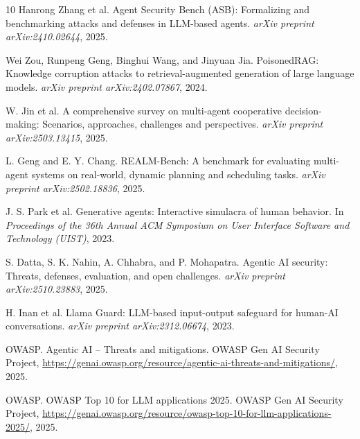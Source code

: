 \documentclass[11pt]{article}
\begin{document}
\begin{thebibliography}{10}
        Hanrong Zhang et al.
        \newblock Agent Security Bench (ASB): Formalizing and benchmarking attacks and defenses in LLM-based agents.
        \newblock \emph{arXiv preprint arXiv:2410.02644}, 2025.

        Wei Zou, Runpeng Geng, Binghui Wang, and Jinyuan Jia.
        \newblock PoisonedRAG: Knowledge corruption attacks to retrieval-augmented generation of large language models.
        \newblock \emph{arXiv preprint arXiv:2402.07867}, 2024.

        W. Jin et al.
        \newblock A comprehensive survey on multi-agent cooperative decision-making: Scenarios, approaches, challenges and perspectives.
        \newblock \emph{arXiv preprint arXiv:2503.13415}, 2025.

        L. Geng and E. Y. Chang.
        \newblock REALM-Bench: A benchmark for evaluating multi-agent systems on real-world, dynamic planning and scheduling tasks.
        \newblock \emph{arXiv preprint arXiv:2502.18836}, 2025.

        J. S. Park et al.
        \newblock Generative agents: Interactive simulacra of human behavior.
        \newblock In \emph{Proceedings of the 36th Annual ACM Symposium on User Interface Software and Technology (UIST)}, 2023.

        S. Datta, S. K. Nahin, A. Chhabra, and P. Mohapatra.
        \newblock Agentic AI security: Threats, defenses, evaluation, and open challenges.
        \newblock \emph{arXiv preprint arXiv:2510.23883}, 2025.

        H. Inan et al.
        \newblock Llama Guard: LLM-based input-output safeguard for human-AI conversations.
        \newblock \emph{arXiv preprint arXiv:2312.06674}, 2023.

        OWASP.
        \newblock Agentic AI -- Threats and mitigations.
        \newblock OWASP Gen AI Security Project, \url{https://genai.owasp.org/resource/agentic-ai-threats-and-mitigations/}, 2025.

        OWASP.
        \newblock OWASP Top 10 for LLM applications 2025.
        \newblock OWASP Gen AI Security Project, \url{https://genai.owasp.org/resource/owasp-top-10-for-llm-applications-2025/}, 2025.

    \end{thebibliography}
\end{document}
